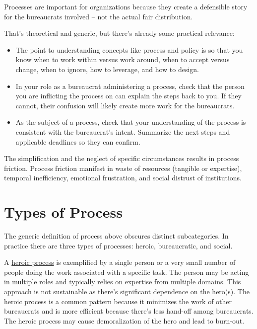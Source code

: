 Processes are important for organizations because they create a defensible story for the bureaucrats involved -- not the actual fair distribution.

That's theoretical and generic, but there's already some practical relevance:
\begin{itemize}
\item The point to understanding concepts like process and policy is so that you know when to work within versus work around, when to accept versus change, when to ignore, how to leverage, and how to design.
    \item In your role as a bureaucrat administering a process, check that the person you are inflicting the process on can explain the steps back to you. If they cannot, their confusion will likely create more work for the bureaucrats. 
    \item As the subject of a process, check that your understanding of the process is consistent with the bureaucrat's intent. Summarize the next steps and applicable deadlines so they can confirm. 
\end{itemize}

The simplification and the neglect of specific circumstances results in process friction. Process friction manifest in waste of resources (tangible or expertise), temporal inefficiency, emotional frustration, and social distrust of institutions.



\section{Types of Process}
The generic definition of process above obscures distinct subcategories. In practice there are three types of processes: heroic, bureaucratic, and social.

A \underline{heroic process} is exemplified by a single person or a very small number of people doing the work associated with a specific task. The person may be acting in multiple roles and typically relies on expertise from multiple domains. This approach is not sustainable as there's significant dependence on the hero(s). The heroic process is a common pattern because it minimizes the work of other bureaucrats and is more efficient because there's less hand-off among bureaucrats. The heroic process may cause demoralization of the hero and lead to burn-out. 

